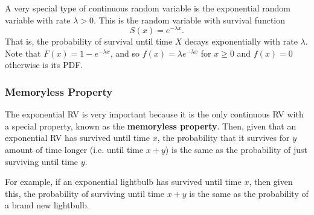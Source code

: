 \documentclass[letterpaper]{article}
\begin{document}
\bigskip 

A very special type of continuous random variable is the exponential random variable with rate $\lambda > 0$. This is the random variable with survival function 
\[S(x) = e^{-\lambda x}.\]
That is, the probability of survival until time $X$ decays exponentially with rate $\lambda$. Note that $F(x) = 1 - e^{-\lambda x}$, and so $f(x) = \lambda e^{-\lambda x}$ for $x \geq 0$ and $f(x) = 0$ otherwise is its PDF. 

\subsubsection{Memoryless Property}
The exponential RV is very important because it is the only continuous RV with a special property, known as the \textbf{memoryless property}. Then, given that an exponential RV has survived until time $x$, the probability that it survives for $y$ amount of time longer (i.e. until time $x + y$) is the same as the probability of just surviving until time $y$. 

\bigskip 

For example, if an exponential lightbulb has survived until time $x$, then given this, the probability of surviving until time $x + y$ is the same as the probability of a brand new lightbulb. 
\end{document}

